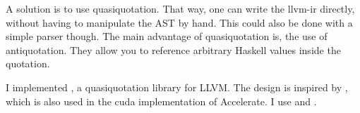 \documentclass[a4paper,bibliography=totocnumbered,parskip=half]{scrbook}
\begin{document}
A solution is to use quasiquotation\cite{mainland2007quote}.
That way, one can write the llvm-ir directly, without having to manipulate the AST by hand.
This could also be done with a simple parser though.
The main advantage of quasiquotation is, the use of antiquotation.
They allow you to reference arbitrary Haskell values inside the quotation.

I implemented , a quasiquotation library for LLVM.
The design is inspired by , which is also used in the cuda implementation of Accelerate.
I use  and .


\appendix

\backmatter
\printbibliography
\end{document}
